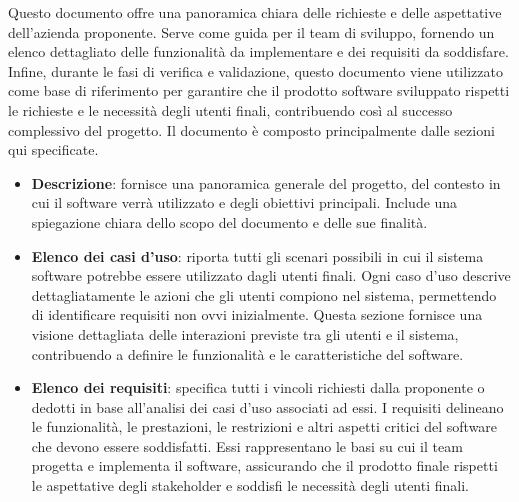 Questo documento offre una panoramica chiara delle richieste e delle aspettative dell'azienda proponente. Serve come guida per il team di sviluppo, fornendo un elenco dettagliato delle funzionalità da implementare e dei requisiti da soddisfare. Infine, durante le fasi di verifica e validazione, questo documento viene utilizzato come base di riferimento per garantire che il prodotto software sviluppato rispetti le richieste e le necessità degli utenti finali, contribuendo così al successo complessivo del progetto.
Il documento è composto principalmente dalle sezioni qui specificate.
\begin{itemize}
	\item \textbf{Descrizione}: fornisce una panoramica generale del progetto, del contesto in cui il software verrà utilizzato e degli obiettivi principali. Include una spiegazione chiara dello scopo del documento e delle sue finalità.
	\item \textbf{Elenco dei casi d'uso}: riporta tutti gli scenari possibili in cui il sistema software potrebbe essere utilizzato dagli utenti finali. Ogni caso d'uso descrive dettagliatamente le azioni che gli utenti compiono nel sistema, permettendo di identificare requisiti non ovvi inizialmente. Questa sezione fornisce una visione dettagliata delle interazioni previste tra gli utenti e il sistema, contribuendo a definire le funzionalità e le caratteristiche del software.
	\item \textbf{Elenco dei requisiti}: specifica tutti i vincoli richiesti dalla proponente o dedotti in base all'analisi dei casi d'uso associati ad essi. I requisiti delineano le funzionalità, le prestazioni, le restrizioni e altri aspetti critici del software che devono essere soddisfatti. Essi rappresentano le basi su cui il team progetta e implementa il software, assicurando che il prodotto finale rispetti le aspettative degli stakeholder e soddisfi le necessità degli utenti finali.
\end{itemize}

